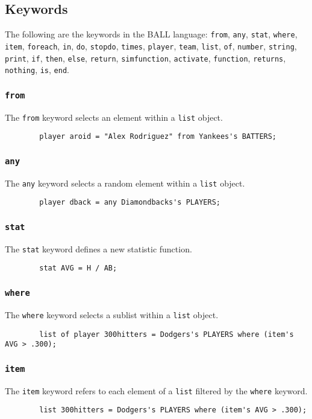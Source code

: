 \subsection{Keywords} \label{keywords}
The following are the keywords in the BALL language: \texttt{from}, \texttt{any}, \texttt{stat}, \texttt{where}, \texttt{item}, \texttt{foreach}, \texttt{in}, \texttt{do}, \texttt{stopdo}, \texttt{times}, \texttt{player}, \texttt{team}, \texttt{list}, \texttt{of},  \texttt{number}, \texttt{string}, \texttt{print}, \texttt{if}, \texttt{then}, \texttt{else}, \texttt{return}, \texttt{simfunction}, \texttt{activate}, \texttt{function}, \texttt{returns}, \texttt{nothing}, \texttt{is}, \texttt{end}.
\subsubsection{\texttt{from}}
The \texttt{from} keyword selects an element within a \texttt{list} object. 
\begin{verbatim}
        player aroid = "Alex Rodriguez" from Yankees's BATTERS;
\end{verbatim}

\subsubsection{\texttt{any}}
The \texttt{any} keyword selects a random element within a \texttt{list} object.
\begin{verbatim}
        player dback = any Diamondbacks's PLAYERS;
\end{verbatim}

\subsubsection{\texttt{stat}}
The \texttt{stat} keyword defines a new statistic function. 
\begin{verbatim}
        stat AVG = H / AB;
\end{verbatim}

\subsubsection{\texttt{where}}
The \texttt{where} keyword selects a sublist within a \texttt{list} object. 
\begin{verbatim}
        list of player 300hitters = Dodgers's PLAYERS where (item's AVG > .300);
\end{verbatim}

\subsubsection{\texttt{item}}
The \texttt{item} keyword refers to each element of a \texttt{list} filtered by the \texttt{where} keyword. 
\begin{verbatim}
        list 300hitters = Dodgers's PLAYERS where (item's AVG > .300);
\end{verbatim}

